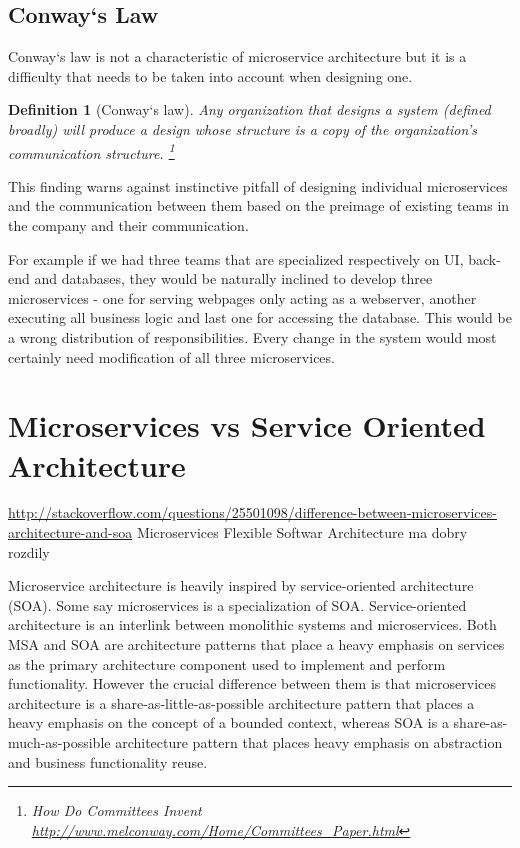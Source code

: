 \documentclass[12pt,oneside]{fithesis2}
\newtheorem{definition}{Definition}
\begin{document}
\subsection{Conway`s Law}

Conway`s law is not a characteristic of microservice architecture but it is a difficulty that needs to be taken into account when designing one.

\begin{definition}[Conway`s law]
Any organization that designs a system (defined broadly) will produce a design whose structure is a copy of the organization’s communication structure. \footnote{How Do Committees Invent \url{http://www.melconway.com/Home/Committees_Paper.html}}
\end{definition}

This finding warns against instinctive pitfall of designing individual microservices and the communication between them based on the preimage of existing teams in the company and their communication.

For example if we had three teams that are specialized respectively on UI, back-end and databases, they would be naturally inclined to develop three microservices - one for serving webpages only acting as a webserver, another executing all business logic and last one for accessing the database. This would be a wrong distribution of responsibilities. Every change in the system would most certainly need modification of all three microservices.

\section{Microservices vs Service Oriented Architecture}

\url{http://stackoverflow.com/questions/25501098/difference-between-microservices-architecture-and-soa}
Microservices Flexible Softwar Architecture ma dobry rozdily

Microservice architecture is heavily inspired by service-oriented architecture (SOA). Some say microservices is a specialization of SOA. Service-oriented architecture is an interlink between monolithic systems and microservices. Both MSA and SOA are architecture patterns that place a heavy emphasis on services as the primary architecture component used to implement and perform functionality. However the crucial difference between them is that microservices architecture is a share-as-little-as-possible architecture pattern that places a heavy emphasis on the concept of a bounded context, whereas SOA is a share-as-much-as-possible architecture pattern that places heavy emphasis on abstraction and business functionality reuse. \cite{mvsoa}
\end{document}
